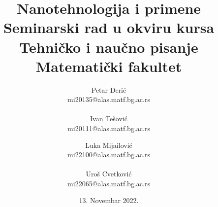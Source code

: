 \documentclass[a4paper]{article}
\begin{document}
\title{Nanotehnologija i primene\vspace{0ex}\\
\small{Seminarski rad u okviru kursa\\
Tehničko i naučno pisanje\\
Matematički fakultet}\vspace{3ex}}
\author{
Petar Đerić\\
mi20135@alas.matf.bg.ac.rs\\\\
Ivan Tešović\\
mi20111@alas.matf.bg.ac.rs\and
Luka Mijailović\\
mi22100@alas.matf.bg.ac.rs\\\\
Uroš Cvetković\\
mi22065@alas.matf.bg.ac.rs
}
\date{13. Novembar 2022.}

\maketitle
\end{document}
